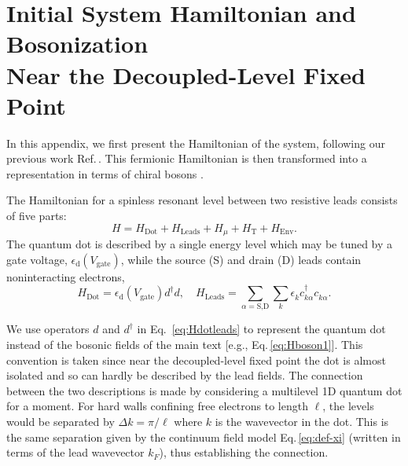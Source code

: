 \documentclass[aps,prb,reprint,floatfix,superscriptaddress,amssymb,amsmath]{revtex4-2}
\newcommand{\phdag}{{\phantom{\dagger}}}
\newcommand{\Vg}{V_\text{gate}}
\begin{document}
\appendix

\section{Initial System Hamiltonian and Bosonization\\Near the Decoupled-Level Fixed Point} 
\label{sec:Hweakcoup}

In this appendix, we first present the Hamiltonian of the system, following our previous work Ref.\,\cite{ZhangNoneqPRR21}.  This fermionic Hamiltonian is then transformed into a representation in terms of chiral bosons \cite{Mebrahtu13, LiuRLdissipPRB14}. 

The Hamiltonian for a spinless resonant level between two resistive leads consists of five parts:
\begin{equation}
H=H_\text{Dot}+H_\text{Leads}+H_\mu+H_\text{T}+H_\text{Env}.
\label{eq:H}
\end{equation}
The quantum dot is described by a single energy level which may be tuned by a gate voltage, $\epsilon_\text{d}(\Vg)$, while the source (S) and drain (D) leads contain noninteracting electrons,
\begin{equation}
H_\text{Dot}\!=\!\epsilon_\text{d}(\Vg) d^\dagger d  ,\quad
H_\text{Leads} = \sum_{\alpha=\text{S,D}} \sum_k \epsilon_k^\phdag c_{k\alpha}^\dagger c_{k\alpha}^\phdag .
\label{eq:Hdotleads}
\end{equation}

We use operators $d$ and $d^{\dagger}$ in Eq.~\eqref{eq:Hdotleads} to represent the quantum dot instead of the bosonic fields of the main text [e.g., Eq.\,\eqref{eq:Hboson1}]. This convention is taken since near the decoupled-level fixed point the dot is almost isolated and so can hardly be described by the lead fields. 
The connection between the two descriptions is made by considering a multilevel 1D quantum dot for a moment. For hard walls confining free electrons to length $\ell$, the levels would be separated by $\Delta k \!=\! \pi/\ell$ where $k$ is the wavevector in the dot. This is the same separation given by the continuum field model Eq.\,\eqref{eq:def-xi} (written in terms of the lead wavevector $k_F$), thus establishing the connection. 
\end{document}
